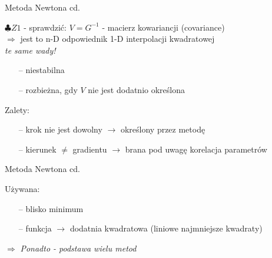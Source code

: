   \begin{frame}{Metoda Newtona cd.}

    \begin{block}{}
      $\clubsuit Z1$ - sprawdzić: $V = G^{-1}$ - macierz kowariancji (covariance)
      \\$\Rightarrow$ jest to n-D odpowiednik 1-D interpolacji kwadratowej
      \smallskip
	  \\ \emph{te same wady!}
	  \begin{itemize}
	  	\item[--] niestabilna
	  	\item[--] rozbieżna, gdy $V$ nie jest dodatnio określona
	  \end{itemize}
	\end{block}
    \begin{block}{Zalety:}
      \begin{itemize}
	  	\item[--] krok nie jest dowolny $\rightarrow$ określony przez metodę
	  	\item[--] kierunek $\neq$ gradientu $\rightarrow$ brana pod uwagę korelacja parametrów
	  \end{itemize}
	\end{block}

  \end{frame}

  \begin{frame}{Metoda Newtona cd.}

	\begin{block}{Używana:}
      \begin{itemize}
	  	\item[--] blisko minimum
	  	\item[--] funkcja $\rightarrow$ dodatnia kwadratowa (liniowe najmniejsze kwadraty) %
	  \end{itemize}
	\end{block}
	\begin{block}{}
	    $\Rightarrow$ \emph{Ponadto - podstawa wielu metod}
	\end{block}

  \end{frame}


